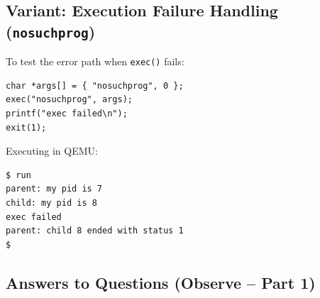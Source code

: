 \documentclass[12pt,a4paper]{article}
\begin{document}
\subsection{Variant: Execution Failure Handling (\texttt{nosuchprog})}
To test the error path when \texttt{exec()} fails:
\begin{lstlisting}[style=cstyle]
char *args[] = { "nosuchprog", 0 };
exec("nosuchprog", args);
printf("exec failed\n");
exit(1);
\end{lstlisting}

Executing in QEMU:
\begin{lstlisting}[style=consolestyle]
$ run
parent: my pid is 7
child: my pid is 8
exec failed
parent: child 8 ended with status 1
$
\end{lstlisting}

\subsection{Answers to Questions (Observe -- Part 1)}
\end{document}
